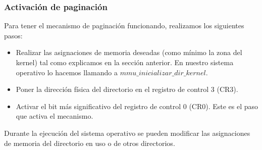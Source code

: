 \subsubsection{Activación de paginación}
Para tener el mecanismo de paginación funcionando, realizamos los siguientes pasos:
\begin{itemize}
\item Realizar las asignaciones de memoria deseadas (como mínimo la zona del kernel) tal como explicamos en la sección anterior. En nuestro sistema operativo lo hacemos llamando a $mmu\_inicializar\_dir\_kernel$.
\item Poner la dirección física del directorio en el registro de control 3 (CR3).
\item Activar el bit más significativo del registro de control 0 (CR0). Este es el paso que activa el mecanismo.
\end{itemize}
Durante la ejecución del sistema operativo se pueden modificar las asignaciones de memoria del directorio en uso o de otros directorios.

